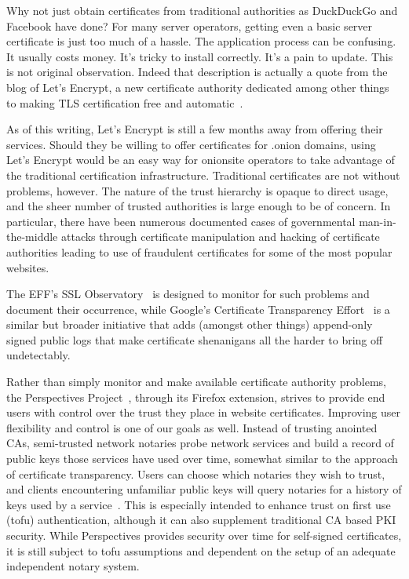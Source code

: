 \documentclass[10pt, conference, compsocconf]{styles/IEEEtran}
\begin{document}
Why not just obtain certificates from traditional authorities as
DuckDuckGo and Facebook have done? For many server operators, getting
even a basic server certificate is just too much of a hassle. The
application process can be confusing. It usually costs money. It's
tricky to install correctly. It's a pain to update. This is not 
original observation. Indeed that description is actually a quote
from the blog of
Let's Encrypt, a new certificate authority dedicated among other
things to making TLS certification free and automatic~\cite{lets-encrypt}.

As of this writing, Let's Encrypt is still a few months away
from offering their services.
Should they be willing to offer certificates for .onion
domains, using Let's Encrypt would be an easy way for
onionsite operators to take advantage of the traditional certification
infrastructure. Traditional certificates are not without problems,
however. The nature of the trust hierarchy is opaque to direct usage,
and the sheer number of trusted authorities is large enough to be of
concern. In particular, there have been numerous documented cases of
governmental man-in-the-middle attacks through certificate
manipulation and hacking of certificate authorities leading to use of
fraudulent certificates for some of the most popular websites.

The EFF's SSL Observatory~\cite{ssl-observatory} is designed to
monitor for such problems and document their occurrence, while
Google's Certificate Transparency
Effort~\cite{certificate-transparency} is a similar but broader
initiative that adds (amongst other things) append-only signed public
logs that make certificate shenanigans all the harder to bring off
undetectably.

Rather than simply monitor and make available certificate authority
problems, the Perspectives Project~\cite{perspectives}, through its
Firefox extension, strives to
provide end users with control over the trust they place in website
certificates. Improving user flexibility
and control is one of our goals as well. Instead of trusting
anointed CAs, semi-trusted network notaries probe network services and
build a record of public keys those services have used over time,
somewhat similar to the approach of certificate transparency. Users
can choose which notaries they wish to trust, and clients encountering
unfamiliar public keys will query notaries for a history of keys used
by a service~\cite{perspectives-paper}. This is especially intended to
enhance trust on first use (tofu) authentication, although it can also
supplement traditional CA based PKI security. While Perspectives
provides security over time for self-signed certificates, it is still
subject to tofu assumptions and dependent on the setup of an adequate
independent notary system.
\end{document}
